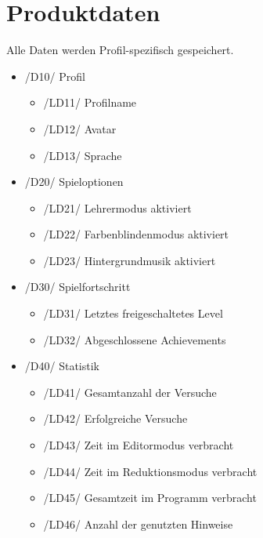 \section{Produktdaten}

Alle Daten werden Profil-spezifisch gespeichert.

\begin{itemize}

\item /D10/ Profil
\begin{itemize}
\item /LD11/ Profilname
\item /LD12/ Avatar
\item /LD13/ Sprache
\end{itemize}

\item /D20/ Spieloptionen
\begin{itemize}
\item /LD21/ Lehrermodus aktiviert
\item /LD22/ Farbenblindenmodus aktiviert
\item /LD23/ Hintergrundmusik aktiviert
\end{itemize}

\item /D30/ Spielfortschritt
\begin{itemize}
\item /LD31/ Letztes freigeschaltetes Level
\item /LD32/ Abgeschlossene Achievements
\end{itemize}

\item /D40/ Statistik
\begin{itemize}
\item /LD41/ Gesamtanzahl der Versuche
\item /LD42/ Erfolgreiche Versuche
\item /LD43/ Zeit im Editormodus verbracht
\item /LD44/ Zeit im Reduktionsmodus verbracht
\item /LD45/ Gesamtzeit im Programm verbracht
\item /LD46/ Anzahl der genutzten Hinweise
\end{itemize}

\end{itemize}
